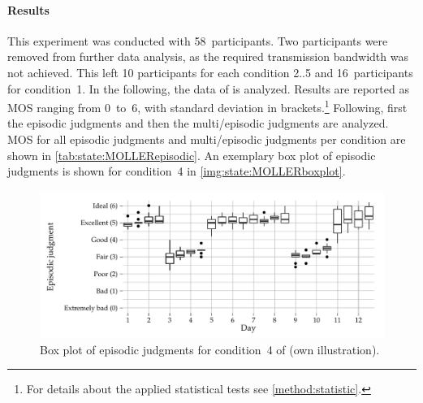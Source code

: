 \paragraph*{Results}
This experiment was conducted with 58~participants. %
Two participants were removed from further data analysis, as the required transmission bandwidth was not achieved.
This left 10 participants for each condition 2..5 and 16~participants for condition~1.
In the following, the data of \citet{moller_single-call_2011} is analyzed.
Results are reported as \ac{MOS} ranging from 0~to~6, with standard deviation in brackets.\footnote{For details about the applied statistical tests see \autoref{method:statistic}.}
Following, first the episodic judgments and then the multi\-/episodic judgments are analyzed.
\ac{MOS} for all episodic judgments and multi\-/episodic judgments per condition are shown in  \autoref{tab:state:MOLLERepisodic}.
An exemplary box plot of episodic judgments is shown for condition~4 in \autoref{img:state:MOLLERboxplot}.

\begin{figure}[t]
	\centering
\begin{knitrout}
\color{fgcolor}
\includegraphics[width=\maxwidth]{figure/plotMOLLER-1} 

\end{knitrout}
	\caption[\citet{moller_single-call_2011}: box plot of episodic judgments for condition~4]{Box plot of episodic judgments for condition~4 of \citet{moller_single-call_2011} (own illustration).}
	\label{img:state:MOLLERboxplot}
\end{figure}

